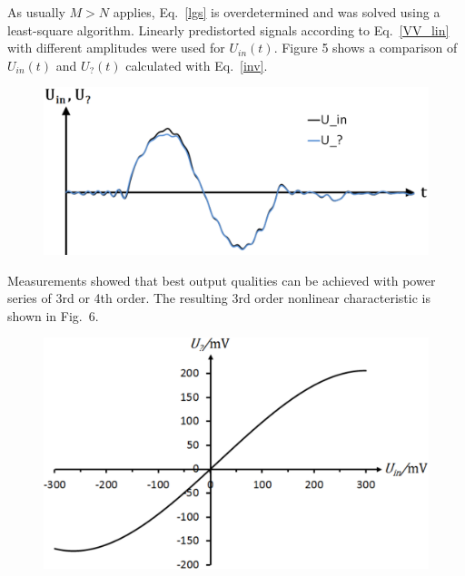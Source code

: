 \documentclass[a4paper,
               keeplastbox,%
               nospread%
              ]{jacow}
\begin{document}
	
	As usually $M>N$ applies, Eq.~\eqref{lgs} is overdetermined and was solved using a least-square algorithm. Linearly predistorted signals according to 
	Eq.~\eqref{VV_lin} with different amplitudes were used for $U_{in}(t)$. Figure 5 shows a comparison of $U_{in}(t)$ and $U_?(t)$ calculated with 
	Eq.~\eqref{inv}.		
	
	\begin{figure}[!h]
	\vspace*{-.5\baselineskip}
	 \begin{center}
	  \includegraphics[scale=0.3]{WEPVA047f5.eps}
	 \label{Vergleich1}
	 \end{center}
	\vspace*{-\baselineskip}	 
	\end{figure}
	
	Measurements showed that best output qualities can be achieved with power series of 3rd or 4th order. The resulting 3rd order nonlinear characteristic 
	is shown in Fig.~6.
	\begin{figure}
	\vspace*{-.5\baselineskip}
	 \begin{center}
	  \includegraphics[scale=0.3]{WEPVA047f6.eps}
	 \label{Kennlinie}
	 \end{center}
	 \vspace*{-\baselineskip}
	\end{figure}
\end{document}
